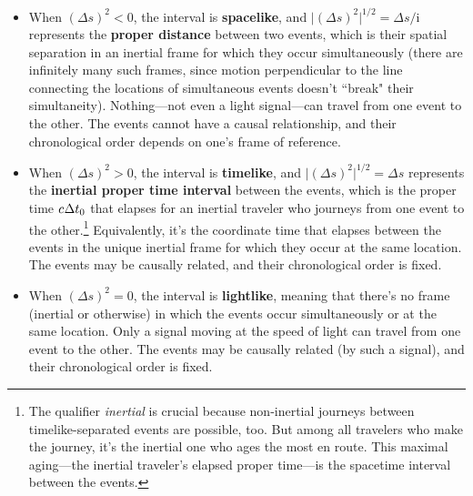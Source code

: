 \documentclass[12pt]{article}
\begin{document}
\begin{itemize}
\item When $(\Delta s)^2<0$, the interval is \textbf{spacelike}, and $\lvert (\Delta s)^2 \rvert ^{1/2} = \Delta s / \mathrm{i}$ represents the \textbf{proper distance} between two events, which is their spatial separation in an inertial frame for which they occur simultaneously (there are infinitely many such frames, since motion perpendicular to the line connecting the locations of simultaneous events doesn't ``break" their simultaneity). Nothing---not even a light signal---can travel from one event to the other. The events cannot have a causal relationship, and their chronological order depends on one's frame of reference.
\item When $(\Delta s)^2>0$, the interval is \textbf{timelike}, and $\lvert(\Delta s)^2\rvert ^{1/2} = \Delta s $ represents the \textbf{inertial proper time interval} between the events, which is the proper time $c \mkern.5mu \Delta t_0$ that elapses for an inertial traveler who journeys from one event to the other.\footnote{The qualifier \emph{inertial} is crucial because non-inertial journeys between timelike-separated events are possible, too. But among all travelers who make the journey, it's the inertial one who ages the most en route. This maximal aging---the inertial traveler's elapsed proper time---is the spacetime interval between the events.} Equivalently, it's the coordinate time that elapses between the events in the unique inertial frame for which they occur at the same location. The events may be causally related, and their chronological order is fixed.
\item When $(\Delta s)^2=0$, the interval is \textbf{lightlike}, meaning that there's no frame (inertial or otherwise) in which the events occur simultaneously or at the same location. Only a signal moving at the speed of light can travel from one event to the other. The events may be causally related (by such a signal), and their chronological order is fixed.
\end{itemize}
\end{document}
